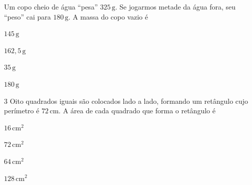 Um copo cheio de água ``pesa'' $325\,\text{g}$. Se jogarmos metade da água fora, seu
``peso'' cai para $180\,\text{g}$. A massa do copo vazio é

\begin{escolha}
\item $145\,\text{g}$
\item $162,5\,\text{g}$
\item $35\,\text{g}$
\item $180\,\text{g}$
\end{escolha}



\num{3}  Oito quadrados iguais são colocados lado a lado, formando um
retângulo cujo perímetro é $72\,\text{cm}$. A área de cada quadrado que forma o
retângulo é

\begin{multicols}{2}
\begin{escolha}
\item $16\,\text{cm}^2$
\item $72\,\text{cm}^2$
\item $64\,\text{cm}^2$
\item $128\,\text{cm}^2$
\end{escolha}
\end{multicols}


